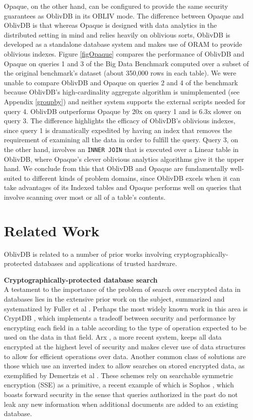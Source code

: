 \documentclass[conference]{IEEEtran}
\def\name/{OblivDB}
\begin{document}
Opaque, on the other hand, can be configured to provide the same security guarantees as \name/ in its OBLIV mode. The difference between Opaque and \name/ is that whereas Opaque is designed with data analytics in the distributed setting in mind and relies heavily on oblivious sorts, \name/ is developed as a standalone database system and makes use of ORAM to provide oblivious indexes. Figure \ref{figOpaque} compares the performance of \name/ and Opaque on queries 1 and 3 of the Big Data Benchmark \cite{BDB} computed over a subset of the original benchmark's dataset (about 350,000 rows in each table). We were unable to compare \name/ and  Opaque on queries 2 and 4 of the benchmark because \name/'s high-cardinality aggregate algorithm is unimplemented (see Appendix \ref{groupby}) and neither system supports the external scripts needed for query 4. \name/ outperforms Opaque by 20x on query 1 and is 6.3x slower on query 3. The difference highlights the efficacy of \name/'s oblivious indexes, since query 1 is dramatically expedited by having an index that removes the requirement of examining all the data in order to fulfill the query. Query 3, on the other hand, involves an \texttt{INNER JOIN} that is executed over a Linear table in \name/, where Opaque's clever oblivious analytics algorithms give it the upper hand. We conclude from this that \name/ and Opaque are fundamentally well-suited to different kinds of problem domains, since \name/ excels when it can take advantages of its Indexed tables and Opaque performs well on queries that involve scanning over most or all of a table's contents. 


\section{Related Work}\label{related}

\name/ is related to a number of prior works involving cryptographically-protected databases and applications of trusted hardware.

\medskip \noindent \textbf{Cryptographically-protected database search}\\
A testament to the importance of the problem of search over encrypted data in databases lies in the extensive prior work on the subject, summarized and systematized by Fuller et al \cite{FVY+17}. Perhaps the most widely known work in this area is CryptDB \cite{PRZB12}, which implements a tradeoff between security and performance by encrypting each field in a table according to the type of operation expected to be used on the data in that field. Arx \cite{PBP16}, a more recent system, keeps all data encrypted at the highest level of security and makes clever use of data structures to allow for efficient operations over data. Another common class of solutions are those which use an inverted index to allow searches on stored encrypted data, as exemplified by Demertzis et al \cite{DPP+16}. These schemes rely on searchable symmetric encryption (SSE) as a primitive, a recent example of which is Sophos \cite{Bost16}, which boasts forward security in the sense that queries authorized in the past do not leak any new information when additional documents are added to an existing database. 
\end{document}
